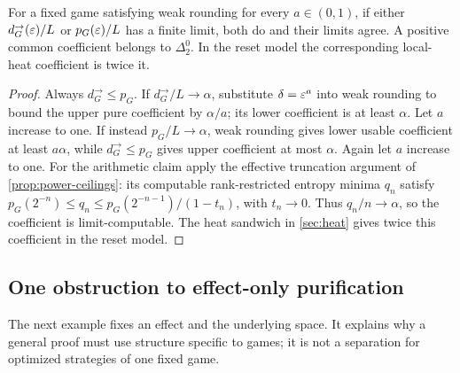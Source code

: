 \begin{corollary}\label{cor:weak-rounding-spectrum}
For a fixed game satisfying weak rounding for every $a\in(0,1)$, if either $d_G^\to(\varepsilon)/L$ or $p_G(\varepsilon)/L$ has a finite limit, both do and their limits agree. A positive common coefficient belongs to $\Delta^0_2$. In the reset model the corresponding local-heat coefficient is twice it.
\end{corollary}
\begin{proof}
Always $d_G^\to\le p_G$. If $d_G^\to/L\to\alpha$, substitute $\delta=\varepsilon^a$ into weak rounding to bound the upper pure coefficient by $\alpha/a$; its lower coefficient is at least $\alpha$. Let $a$ increase to one. If instead $p_G/L\to\alpha$, weak rounding gives lower usable coefficient at least $a\alpha$, while $d_G^\to\le p_G$ gives upper coefficient at most $\alpha$. Again let $a$ increase to one. For the arithmetic claim apply the effective truncation argument of \cref{prop:power-ceilings}: its computable rank-restricted entropy minima $q_n$ satisfy $p_G(2^{-n})\le q_n\le p_G(2^{-n-1})/(1-t_n)$, with $t_n\to0$. Thus $q_n/n\to\alpha$, so the coefficient is limit-computable. The heat sandwich in \cref{sec:heat} gives twice this coefficient in the reset model.
\end{proof}

\subsection{One obstruction to effect-only purification}
The next example fixes an effect and the underlying space. It explains why a general proof must use structure specific to games; it is not a separation for optimized strategies of one fixed game.

